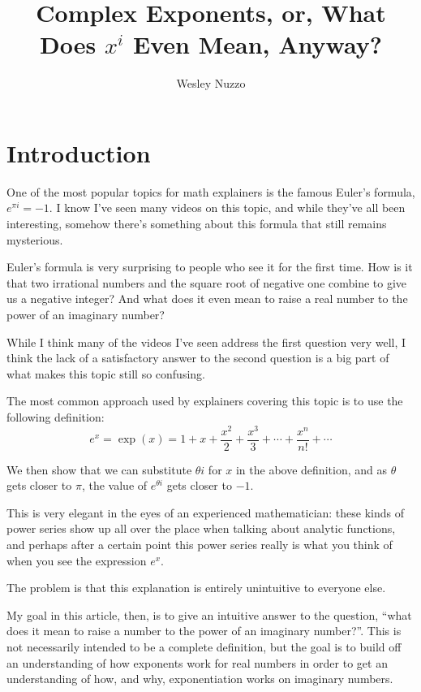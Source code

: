 \documentclass[11pt, oneside]{article}   	%
\title{Complex Exponents, or, What Does $x^i$ Even Mean, Anyway?}
\author{Wesley Nuzzo}
\begin{document}
\maketitle

\section{Introduction}

One of the most popular topics for math explainers is the famous Euler's formula, \(e^{\pi i}=-1\).
I know I've seen many videos on this topic, and while they've all been interesting, somehow there's something about this formula that still remains mysterious.

Euler's formula is very surprising to people who see it for the first time. How is it that two irrational numbers and the square root of negative one combine to give us a negative integer? And what does it even mean to raise a real number to the power of an imaginary number?

While I think many of the videos I've seen address the first question very well, I think the lack of a satisfactory answer to the second question is a big part of what makes this topic still so confusing. 

The most common approach used by explainers covering this topic is to use the following definition:
\[e^x=\exp(x)=1+x+\frac{x^2}{2}+\frac{x^3}{3} + \cdots + \frac{x^n}{n!} + \cdots\]

We then show that we can substitute $\theta i$ for $x$ in the above definition, and as $\theta$ gets closer to $\pi$, the value of $e^{\theta i}$ gets closer to $-1$. 

This is very elegant in the eyes of an experienced mathematician: these kinds of power series show up all over the place when talking about analytic functions, and perhaps after a certain point this power series really is what you think of when you see the expression $e^x$. 

The problem is that this explanation is entirely unintuitive to everyone else.

My goal in this article, then, is to give an intuitive answer to the question, ``what does it mean to raise a number to the power of an imaginary number?''. This is not necessarily intended to be a complete definition, but the goal is to build off an understanding of how exponents work for real numbers in order to get an understanding of how, and why, exponentiation works on imaginary numbers.
\end{document}
